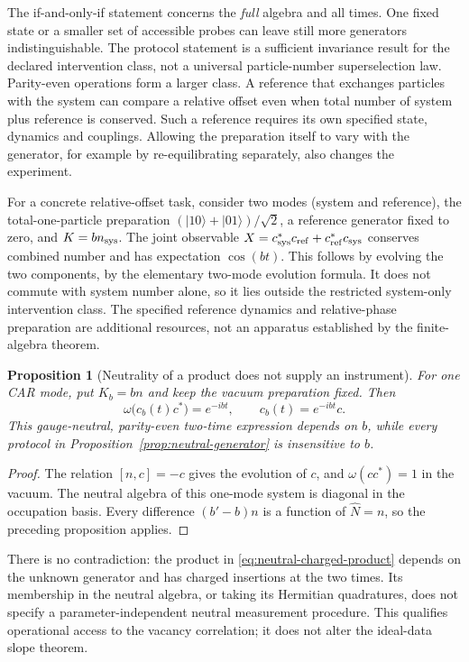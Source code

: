 \documentclass[11pt]{article}
\newtheorem{proposition}[theorem]{Proposition}
\theoremstyle{definition}
\begin{document}
The if-and-only-if statement concerns the \emph{full} algebra and all times.
One fixed state or a smaller set of accessible probes can leave still more
generators indistinguishable. The protocol statement is a sufficient
invariance result for the declared intervention class, not a universal
particle-number superselection law. Parity-even operations form a larger
class. A reference that exchanges particles with the system can compare a
relative offset even when total number of system plus reference is conserved.
Such a reference requires its own specified state, dynamics and couplings.
Allowing the preparation itself to vary with the generator, for example by
re-equilibrating separately, also changes the experiment.

For a concrete relative-offset task, consider two modes (system and
reference), the total-one-particle preparation
$(|10\rangle+|01\rangle)/\sqrt2$, a reference generator fixed to zero,
and $K=b n_{\rm sys}$. The joint observable
$X=c_{\rm sys}^*c_{\rm ref}+c_{\rm ref}^*c_{\rm sys}$ conserves combined
number and has expectation $\cos(bt)$. This follows by evolving the two
components, by the elementary two-mode evolution formula. It does not
commute with system number alone, so it lies outside the restricted
system-only intervention class. The specified reference dynamics and
relative-phase preparation are additional resources, not an apparatus
established by the finite-algebra theorem.

\begin{proposition}[Neutrality of a product does not supply an instrument]
\label{prop:neutral-access}
For one CAR mode, put $K_b=b n$ and keep the vacuum preparation fixed.
Then
\begin{equation}
 \omega\bigl(c_b(t)c^*\bigr)=e^{-ibt},
 \qquad c_b(t)=e^{-ibt}c.
 \label{eq:neutral-charged-product}
\end{equation}
This gauge-neutral, parity-even two-time expression depends on $b$, while
every protocol in Proposition~\ref{prop:neutral-generator} is insensitive
to $b$.
\end{proposition}
\begin{proof}
The relation $[n,c]=-c$ gives the evolution of $c$, and
$\omega(cc^*)=1$ in the vacuum. The neutral algebra of this one-mode system
is diagonal in the occupation basis. Every difference $(b'-b)n$ is a
function of $\widehat N=n$, so the preceding proposition applies.
\end{proof}

There is no contradiction: the product in
\eqref{eq:neutral-charged-product} depends on the unknown generator and has
charged insertions at the two times. Its membership in the neutral algebra,
or taking its Hermitian quadratures, does not specify a parameter-independent
neutral measurement procedure. This qualifies operational access to the
vacancy correlation; it does not alter the ideal-data slope theorem.
\end{document}
